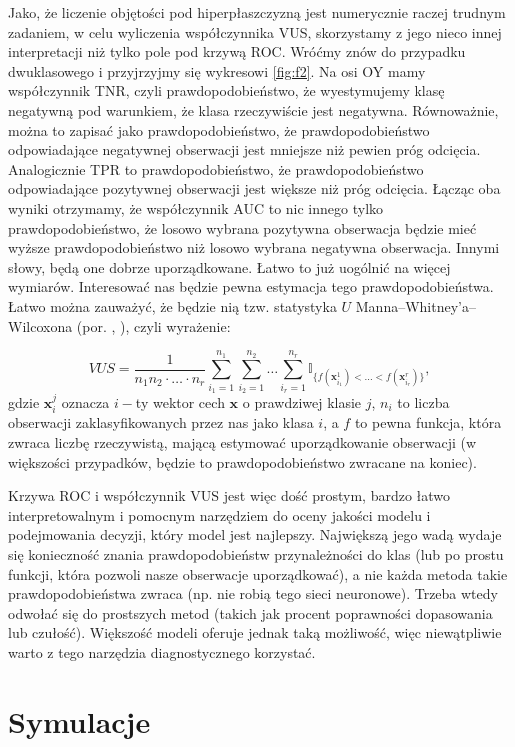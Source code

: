 \documentclass{mini}
\begin{document}
Jako, że liczenie objętości pod hiperpłaszczyzną jest numerycznie raczej trudnym zadaniem, w celu wyliczenia współczynnika VUS, skorzystamy z jego nieco innej interpretacji niż tylko pole pod krzywą ROC. Wróćmy znów do przypadku dwuklasowego i przyjrzyjmy się wykresowi \ref{fig:f2}. Na osi OY mamy współczynnik TNR, czyli prawdopodobieństwo, że wyestymujemy klasę negatywną pod warunkiem, że klasa rzeczywiście jest negatywna. Równoważnie, można to zapisać jako prawdopodobieństwo, że prawdopodobieństwo odpowiadające negatywnej obserwacji jest mniejsze niż pewien próg odcięcia. Analogicznie TPR to prawdopodobieństwo, że prawdopodobieństwo odpowiadające pozytywnej obserwacji jest większe niż próg odcięcia. Łącząc oba wyniki otrzymamy, że współczynnik AUC to nic innego tylko prawdopodobieństwo, że losowo wybrana pozytywna obserwacja będzie mieć wyższe prawdopodobieństwo niż losowo wybrana negatywna obserwacja. Innymi słowy, będą one dobrze uporządkowane. Łatwo to już uogólnić na więcej wymiarów. Interesować nas będzie pewna estymacja tego prawdopodobieństwa. Łatwo można zauważyć, że będzie nią tzw. statystyka $U$  Manna–Whitney'a–Wilcoxona (por. \cite{roc1}, \cite{roc2}), czyli wyrażenie:

$$
VUS = \dfrac{1}{n_1n_2\cdot\ldots\cdot n_r}\sum_{i_1=1}^{n_1}\sum_{i_2=1}^{n_2}\ldots\sum_{i_r=1}^{n_r}\mathbb{I}_{\lbrace f(\mathbf{x}_{i_1}^1)<\ldots<f(\mathbf{x}_{i_r}^r)\rbrace},
$$
gdzie $\textbf{x}_i^j$ oznacza $i-$ty wektor cech $\mathbf{x}$ o prawdziwej klasie $j$, $n_i$ to liczba obserwacji zaklasyfikowanych przez nas jako klasa $i$, a $f$ to pewna funkcja, która zwraca liczbę rzeczywistą, mającą estymować uporządkowanie obserwacji (w większości przypadków, będzie to prawdopodobieństwo zwracane na koniec).

Krzywa ROC i współczynnik VUS jest więc dość prostym, bardzo łatwo interpretowalnym i pomocnym narzędziem do oceny jakości modelu i podejmowania decyzji, który model jest najlepszy. Największą jego wadą wydaje się konieczność znania prawdopodobieństw przynależności do klas (lub po prostu funkcji, która pozwoli nasze obserwacje uporządkować), a nie każda metoda takie prawdopodobieństwa zwraca (np. nie robią tego sieci neuronowe). Trzeba wtedy odwołać się do prostszych metod (takich jak procent poprawności dopasowania lub czułość). Większość modeli oferuje jednak taką możliwość, więc niewątpliwie warto z tego narzędzia diagnostycznego korzystać.

\chapter{Symulacje}
\end{document}
